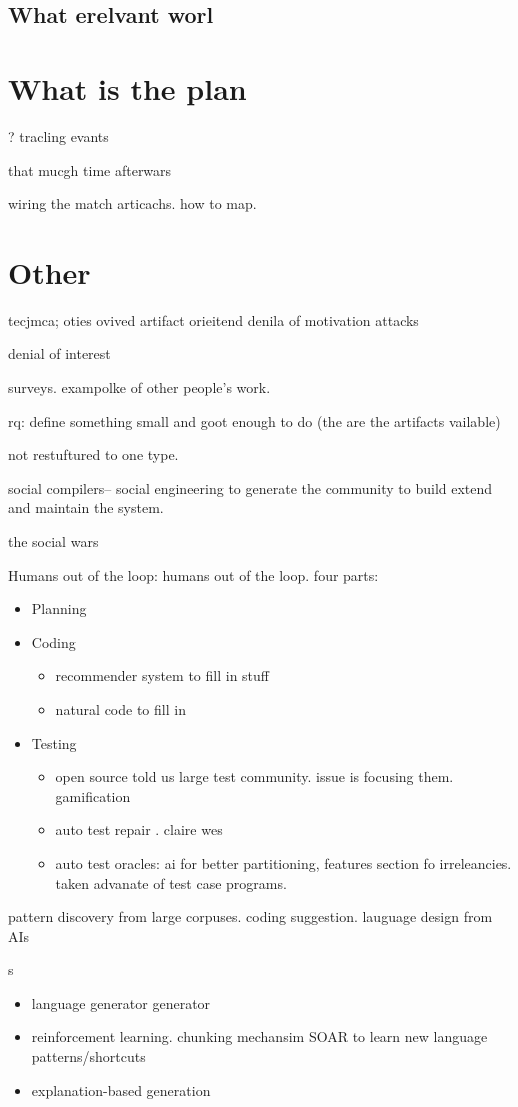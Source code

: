 \documentclass[journal]{IEEEtran}
\newcommand{\bi}{\begin{itemize}}
\newcommand{\ei}{\end{itemize}}
\begin{document}
\subsection{What erelvant worl}

\section{What is the plan}?
tracling evants

that mucgh time afterwars

wiring the match articachs. how to map.

\section{Other}
tecjmca; oties ovived
artifact orieitend
denila of motivation attacks

denial of interest

surveys. exampolke of other people's work.

rq: define something small and goot enough to do (the are the artifacts vailable)

not restuftured to one type.


social compilers-- social engineering to generate the community to build
extend and maintain the system. 

the social wars

Humans out of the loop: humans out of the loop. four parts:
\bi
\item Planning
\item Coding
\bi
\item recommender system to fill in stuff
\item natural code to fill in
\ei
\item Testing
\bi
\item open source told us large test community. issue is focusing them. gamification
\item auto test repair . claire wes
\item auto test oracles: ai for better partitioning, features section fo irreleancies.
taken advanate of test case programs. 
\ei
\ei

pattern discovery from large corpuses. coding suggestion. lauguage design from AIs 

s
\bi
\item language generator generator
\item reinforcement learning. chunking mechansim SOAR to learn new language patterns/shortcuts
\item explanation-based generation
\ei
\end{document}

